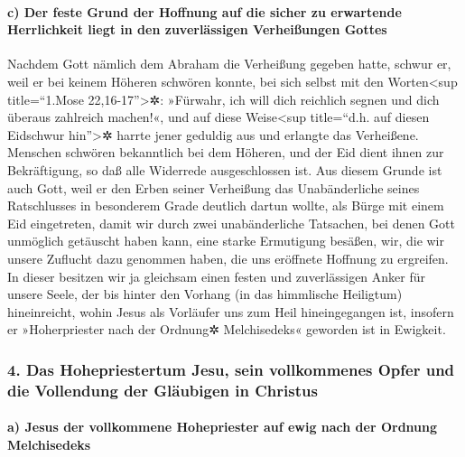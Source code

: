 \hypertarget{c-der-feste-grund-der-hoffnung-auf-die-sicher-zu-erwartende-herrlichkeit-liegt-in-den-zuverluxe4ssigen-verheiuxdfungen-gottes}{%
\paragraph{c) Der feste Grund der Hoffnung auf die sicher zu erwartende
Herrlichkeit liegt in den zuverlässigen Verheißungen
Gottes}\label{c-der-feste-grund-der-hoffnung-auf-die-sicher-zu-erwartende-herrlichkeit-liegt-in-den-zuverluxe4ssigen-verheiuxdfungen-gottes}}

 Nachdem Gott nämlich dem Abraham die Verheißung gegeben
hatte, schwur er, weil er bei keinem Höheren schwören konnte, bei sich
selbst  mit den Worten\textless sup title=``1.Mose
22,16-17''\textgreater✲: »Fürwahr, ich will dich reichlich segnen und
dich überaus zahlreich machen!«,  und auf diese
Weise\textless sup title=``d.h. auf diesen Eidschwur hin''\textgreater✲
harrte jener geduldig aus und erlangte das Verheißene. 
Menschen schwören bekanntlich bei dem Höheren, und der Eid dient ihnen
zur Bekräftigung, so daß alle Widerrede ausgeschlossen ist.
 Aus diesem Grunde ist auch Gott, weil er den Erben
seiner Verheißung das Unabänderliche seines Ratschlusses in besonderem
Grade deutlich dartun wollte, als Bürge mit einem Eid eingetreten,
 damit wir durch zwei unabänderliche Tatsachen, bei denen
Gott unmöglich getäuscht haben kann, eine starke Ermutigung besäßen,
wir, die wir unsere Zuflucht dazu genommen haben, die uns eröffnete
Hoffnung zu ergreifen.  In dieser besitzen wir ja
gleichsam einen festen und zuverlässigen Anker für unsere Seele, der bis
hinter den Vorhang (in das himmlische Heiligtum) hineinreicht,
 wohin Jesus als Vorläufer uns zum Heil hineingegangen
ist, insofern er »Hoherpriester nach der Ordnung✲ Melchisedeks« geworden
ist in Ewigkeit.

\hypertarget{das-hohepriestertum-jesu-sein-vollkommenes-opfer-und-die-vollendung-der-gluxe4ubigen-in-christus}{%
\subsubsection{4. Das Hohepriestertum Jesu, sein vollkommenes Opfer und
die Vollendung der Gläubigen in
Christus}\label{das-hohepriestertum-jesu-sein-vollkommenes-opfer-und-die-vollendung-der-gluxe4ubigen-in-christus}}

\hypertarget{a-jesus-der-vollkommene-hohepriester-auf-ewig-nach-der-ordnung-melchisedeks}{%
\paragraph{a) Jesus der vollkommene Hohepriester auf ewig nach der
Ordnung
Melchisedeks}\label{a-jesus-der-vollkommene-hohepriester-auf-ewig-nach-der-ordnung-melchisedeks}}

